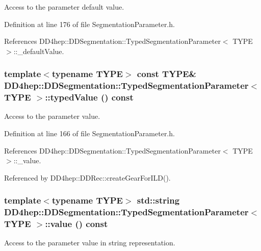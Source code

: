 Access to the parameter default value. 

Definition at line 176 of file SegmentationParameter.h.

References DD4hep::DDSegmentation::TypedSegmentationParameter$<$ TYPE $>$::\_\-defaultValue.\hypertarget{class_d_d4hep_1_1_d_d_segmentation_1_1_typed_segmentation_parameter_abf712bbc2120c2614f7c07124b629c4c}{
\subsubsection[{typedValue}]{\setlength{\rightskip}{0pt plus 5cm}template$<$typename TYPE$>$ const TYPE\& {\bf DD4hep::DDSegmentation::TypedSegmentationParameter}$<$ TYPE $>$::typedValue () const}}
\label{class_d_d4hep_1_1_d_d_segmentation_1_1_typed_segmentation_parameter_abf712bbc2120c2614f7c07124b629c4c}


Access to the parameter value. 

Definition at line 166 of file SegmentationParameter.h.

References DD4hep::DDSegmentation::TypedSegmentationParameter$<$ TYPE $>$::\_\-value.

Referenced by DD4hep::DDRec::createGearForILD().\hypertarget{class_d_d4hep_1_1_d_d_segmentation_1_1_typed_segmentation_parameter_a71988bceae6a646bf38ca704d35f9de3}{
\subsubsection[{value}]{\setlength{\rightskip}{0pt plus 5cm}template$<$typename TYPE$>$ std::string {\bf DD4hep::DDSegmentation::TypedSegmentationParameter}$<$ TYPE $>$::value () const}}
\label{class_d_d4hep_1_1_d_d_segmentation_1_1_typed_segmentation_parameter_a71988bceae6a646bf38ca704d35f9de3}


Access to the parameter value in string representation. 


